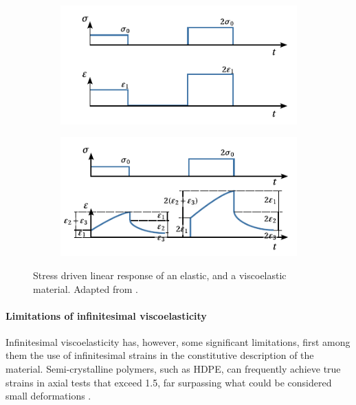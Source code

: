\begin{figure}[hbtp]
\centering
\begin{subfigure}[b]{0.49\textwidth}
            \centering
            \includegraphics[width=\textwidth]{figures/elastic_linearity}
            \caption{}
            \label{subfig:elastic_linearity}
    \end{subfigure} \hfill
    \begin{subfigure}[b]{0.49\textwidth}
            \centering
            \includegraphics[width=\textwidth]{figures/viscoelastic_linearity}
            \caption{}
            \label{subfig:viscoelastic_linearity}
    \end{subfigure}
  \caption{Stress driven linear response of  an elastic, and  a viscoelastic material. Adapted from \cite{wardIntroductionMechanicalProperties2004}.}
\label{fig:linearity}
\end{figure}

\paragraph{Limitations of infinitesimal viscoelasticity}
Infinitesimal viscoelasticity has, however, some significant limitations, first among them the use of infinitesimal strains in the constitutive description of the material.
Semi-crystalline polymers, such as HDPE, can frequently achieve true strains in axial tests that exceed 1.5, far surpassing what could be considered small deformations \citep{gsellYieldTransientEffects1981}.

